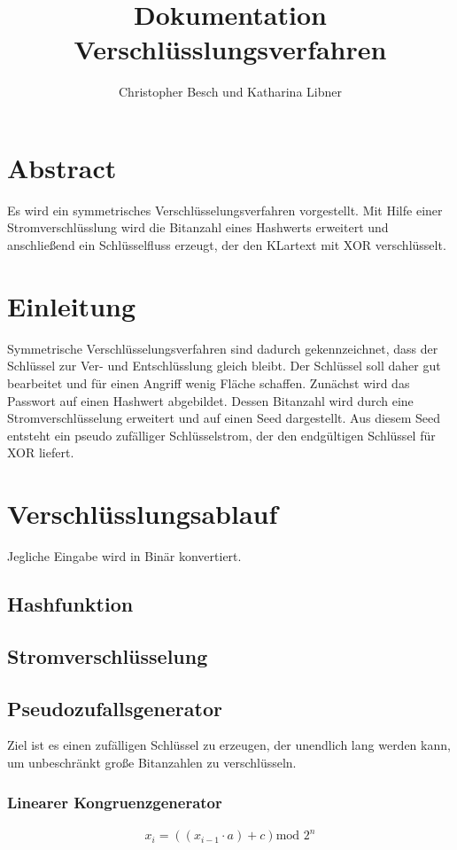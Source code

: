 \documentclass[10pt,a4paper]{article}
\author{Christopher Besch und Katharina Libner}
\title{Dokumentation Verschlüsslungsverfahren}
\begin{document}
\maketitle
\tableofcontents
\newpage
\section{Abstract}
Es wird ein symmetrisches Verschlüsselungsverfahren vorgestellt. Mit Hilfe einer Stromverschlüsslung wird die Bitanzahl eines Hashwerts erweitert und anschließend ein Schlüsselfluss erzeugt, der den KLartext mit XOR verschlüsselt.  
\section{Einleitung}
Symmetrische Verschlüsselungsverfahren sind dadurch  gekennzeichnet, dass der Schlüssel zur Ver- und Entschlüsslung gleich bleibt. Der Schlüssel soll daher gut bearbeitet und für einen Angriff wenig Fläche schaffen. Zunächst wird das Passwort auf einen Hashwert abgebildet. Dessen Bitanzahl wird durch eine Stromverschlüsselung erweitert und auf einen Seed dargestellt. Aus diesem Seed entsteht ein pseudo zufälliger Schlüsselstrom, der den endgültigen Schlüssel für XOR liefert. 
\section{Verschlüsslungsablauf}
Jegliche Eingabe wird in Binär konvertiert. 
\subsection{Hashfunktion}
\subsection{Stromverschlüsselung}
\subsection{Pseudozufallsgenerator}
Ziel ist es einen \glqq zufälligen\grqq{} Schlüssel zu erzeugen, der unendlich lang werden kann, um unbeschränkt große Bitanzahlen zu verschlüsseln.
\subsubsection{Linearer Kongruenzgenerator}
\begin{align*}
    x_i=\left(\left( x_{i-1}\cdot a\right) +c\right) \text{mod } 2^n
\end{align*}
\end{document}
